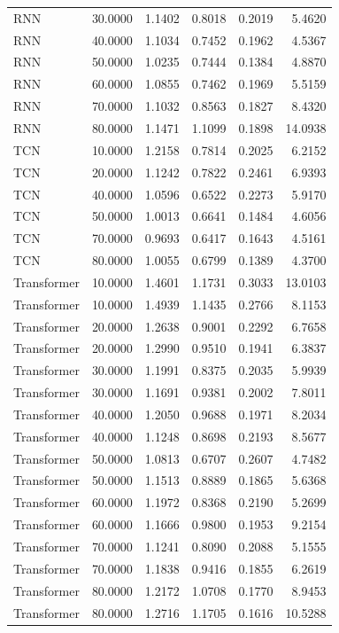 \begin{tabular}{lrrrrr}
RNN & 30.0000 & 1.1402 & 0.8018 & 0.2019 & 5.4620 \\
RNN & 40.0000 & 1.1034 & 0.7452 & 0.1962 & 4.5367 \\
RNN & 50.0000 & 1.0235 & 0.7444 & 0.1384 & 4.8870 \\
RNN & 60.0000 & 1.0855 & 0.7462 & 0.1969 & 5.5159 \\
RNN & 70.0000 & 1.1032 & 0.8563 & 0.1827 & 8.4320 \\
RNN & 80.0000 & 1.1471 & 1.1099 & 0.1898 & 14.0938 \\
TCN & 10.0000 & 1.2158 & 0.7814 & 0.2025 & 6.2152 \\
TCN & 20.0000 & 1.1242 & 0.7822 & 0.2461 & 6.9393 \\
TCN & 40.0000 & 1.0596 & 0.6522 & 0.2273 & 5.9170 \\
TCN & 50.0000 & 1.0013 & 0.6641 & 0.1484 & 4.6056 \\
TCN & 70.0000 & 0.9693 & 0.6417 & 0.1643 & 4.5161 \\
TCN & 80.0000 & 1.0055 & 0.6799 & 0.1389 & 4.3700 \\
Transformer & 10.0000 & 1.4601 & 1.1731 & 0.3033 & 13.0103 \\
Transformer & 10.0000 & 1.4939 & 1.1435 & 0.2766 & 8.1153 \\
Transformer & 20.0000 & 1.2638 & 0.9001 & 0.2292 & 6.7658 \\
Transformer & 20.0000 & 1.2990 & 0.9510 & 0.1941 & 6.3837 \\
Transformer & 30.0000 & 1.1991 & 0.8375 & 0.2035 & 5.9939 \\
Transformer & 30.0000 & 1.1691 & 0.9381 & 0.2002 & 7.8011 \\
Transformer & 40.0000 & 1.2050 & 0.9688 & 0.1971 & 8.2034 \\
Transformer & 40.0000 & 1.1248 & 0.8698 & 0.2193 & 8.5677 \\
Transformer & 50.0000 & 1.0813 & 0.6707 & 0.2607 & 4.7482 \\
Transformer & 50.0000 & 1.1513 & 0.8889 & 0.1865 & 5.6368 \\
Transformer & 60.0000 & 1.1972 & 0.8368 & 0.2190 & 5.2699 \\
Transformer & 60.0000 & 1.1666 & 0.9800 & 0.1953 & 9.2154 \\
Transformer & 70.0000 & 1.1241 & 0.8090 & 0.2088 & 5.1555 \\
Transformer & 70.0000 & 1.1838 & 0.9416 & 0.1855 & 6.2619 \\
Transformer & 80.0000 & 1.2172 & 1.0708 & 0.1770 & 8.9453 \\
Transformer & 80.0000 & 1.2716 & 1.1705 & 0.1616 & 10.5288 \\
\bottomrule
\end{tabular}
